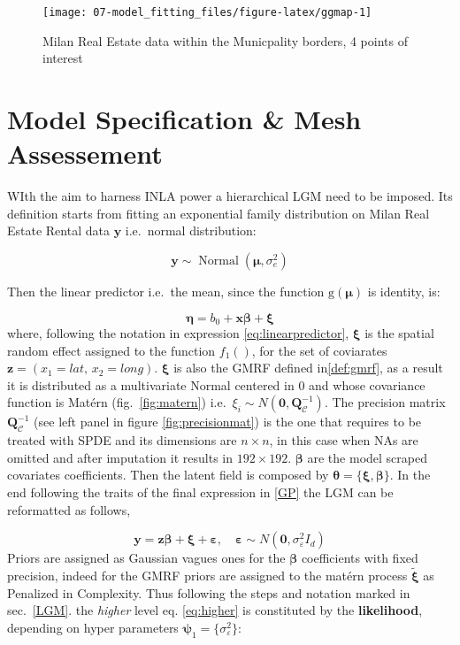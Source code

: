 \documentclass[
  12pt,
  a4paper,
  oneside]{book}
\theoremstyle{definition}
\theoremstyle{definition}
\theoremstyle{definition}
\theoremstyle{remark}
\begin{document}
\begin{figure}

{\centering \texttt{[image: 07-model\_fitting\_files/figure-latex/ggmap-1]} 

}

\caption{Milan Real Estate data within the Municpality borders, 4 points of interest}\label{fig:ggmap}
\end{figure}

\hypertarget{modelspecandmesh}{%
\section{Model Specification \& Mesh Assessement}\label{modelspecandmesh}}

WIth the aim to harness INLA power a hierarchical LGM need to be imposed. Its definition starts from fitting an exponential family distribution on Milan Real Estate Rental data \(\mathbf{y}\) i.e.~normal distribution:

\[
\mathbf{y}\sim \operatorname{Normal}\left(\boldsymbol\mu, \sigma_{e}^{2}\right)
\]

Then the linear predictor i.e.~the mean, since the function \(\mathrm{g}\left(\boldsymbol\mu\right)\) is identity, is:

\[
\boldsymbol\eta=b_{0}+\boldsymbol x \boldsymbol\beta+\boldsymbol\xi 
\]
where, following the notation in expression \eqref{eq:linearpredictor}, \(\boldsymbol\xi\) is the spatial random effect assigned to the function \(f_1()\), for the set of coviarates \(\boldsymbol{z}=\left(x_{1} = lat,\, x_{2} = long\right)\). \(\boldsymbol\xi\) is also the GMRF defined in\ref{def:gmrf}, as a result it is distributed as a multivariate Normal centered in 0 and whose covariance function is Matérn (fig.~\ref{fig:matern}) i.e.~\(\xi_{i} \sim N\left(\mathbf{0}, \mathbf{Q}_{\mathscr{C}}^{-1}\right)\). The precision matrix \(\mathbf{Q}_{\mathscr{C}}^{-1}\) (see left panel in figure \ref{fig:precisionmat}) is the one that requires to be treated with SPDE and its dimensions are \(n \times n\), in this case when NAs are omitted and after imputation it results in \(192 \times 192\).
\(\boldsymbol\beta\) are the model scraped covariates coefficients.
Then the latent field is composed by \(\boldsymbol{\theta}=\{\boldsymbol{\xi}, \boldsymbol{\beta}\}\). In the end following the traits of the final expression in \ref{GP} the LGM can be reformatted as follows,

\[
\boldsymbol{\mathbf{y}}=\boldsymbol{z} \boldsymbol{\beta}+\boldsymbol{\xi}+\boldsymbol{\varepsilon}, \quad \boldsymbol{\varepsilon} \sim N\left(\mathbf{0},  \sigma^2_{\varepsilon} I_{d}\right)
\]
Priors are assigned as Gaussian vagues ones for the \(\boldsymbol\beta\) coefficients with fixed precision, indeed for the GMRF priors are assigned to the matérn process \(\tilde{\boldsymbol\xi}\) as Penalized in Complexity.
Thus following the steps and notation marked in sec.~\ref{LGM}. the \emph{higher} level eq. \eqref{eq:higher} is constituted by the \textbf{likelihood}, depending on hyper parameters \(\boldsymbol\psi_1 = \{\sigma_{\varepsilon}^2\}\):
\end{document}
